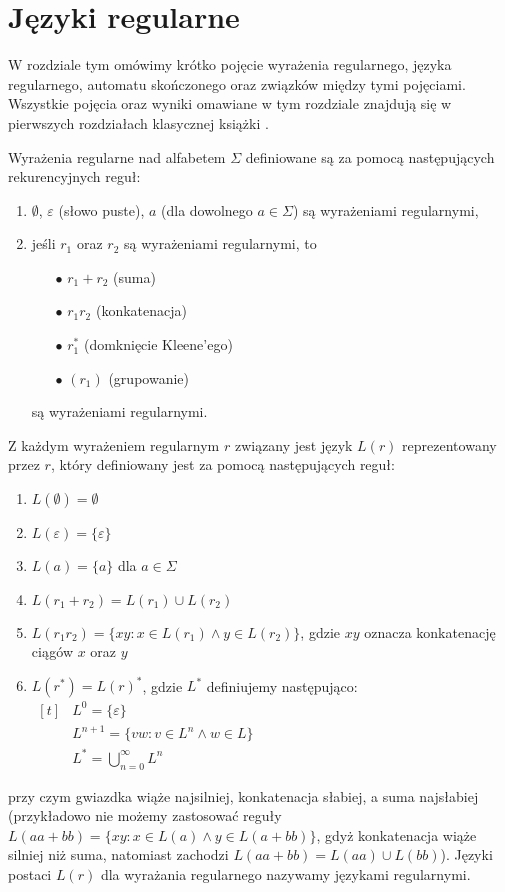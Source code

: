 
\chapter{Języki regularne}
W rozdziale tym omówimy krótko pojęcie wyrażenia regularnego, języka regularnego, automatu skończonego oraz związków między tymi pojęciami. Wszystkie pojęcia oraz wyniki omawiane w tym rozdziale znajdują się w pierwszych rozdziałach klasycznej książki \cite{HopUll2003}. 

Wyrażenia regularne nad alfabetem $\Sigma$ definiowane są za pomocą następujących rekurencyjnych reguł:
\begin{enumerate}
    \item $\emptyset$, $\varepsilon$ (słowo puste), $a$ (dla dowolnego $a\in\Sigma$) są wyrażeniami regularnymi,
    \item jeśli $r_1$ oraz $r_2$ są wyrażeniami regularnymi, to
    \begin{itemize}
        \item[$\bullet$] $r_1+r_2$ (suma)
        \item[$\bullet$] $r_1 r_2$ (konkatenacja)
        \item[$\bullet$] $r_1^*$ (domknięcie Kleene'ego)
        \item[$\bullet$] $(r_1)$ (grupowanie)
    \end{itemize}
    są wyrażeniami regularnymi.
\end{enumerate}
Z każdym wyrażeniem regularnym $r$ związany jest język $L(r)$ reprezentowany przez $r$, który definiowany jest za pomocą następujących reguł:
\begin{enumerate}
    \item $L(\emptyset) = \emptyset$
    \item $L(\varepsilon) = \{\varepsilon\}$
    \item $L(a) = \{a\}$ dla $a \in \Sigma$
    \item $L(r_1+r_2) = L(r_1)\cup L(r_2)$
    \item $L(r_1 r_2) = \{xy:x \in L(r_1) \land y\in L(r_2)\}$, gdzie $xy$ oznacza konkatenację ciągów $x$ oraz $y$
    \item $L(r^*) = L(r)^*$, gdzie $L^*$ definiujemy następująco:\\
    $\begin{aligned}[t]
        &L^0=\{\varepsilon\}\\
        &L^{n+1}=\{vw: v\in L^n\wedge w\in L\}\\
        &L^*=\bigcup_{n=0}^{\infty}{L^n}
    \end{aligned}$
\end{enumerate}
przy czym gwiazdka wiąże najsilniej, konkatenacja słabiej, a suma najsłabiej (przykładowo nie możemy zastosować reguły $L(aa+bb)=\{xy: x\in L(a) \wedge y\in L(a+bb)\}$, gdyż konkatenacja wiąże silniej niż suma, natomiast zachodzi $L(aa+bb)=L(aa)\cup L(bb)$). Języki postaci $L(r)$ dla wyrażania regularnego nazywamy językami regularnymi.

